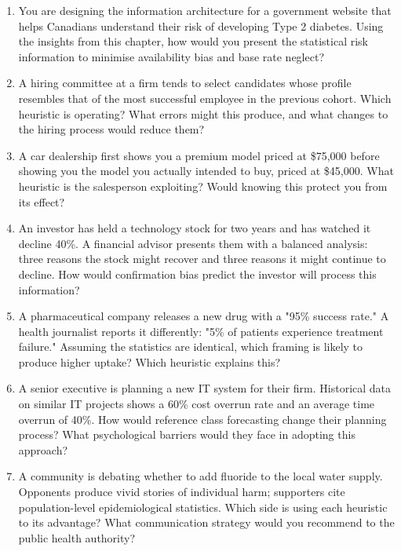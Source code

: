 \documentclass[12pt, letterpaper]{article}
\begin{document}
\begin{enumerate}
\item You are designing the information architecture for a government website that helps Canadians understand their risk of developing Type 2 diabetes. Using the insights from this chapter, how would you present the statistical risk information to minimise availability bias and base rate neglect?

\item A hiring committee at a firm tends to select candidates whose profile resembles that of the most successful employee in the previous cohort. Which heuristic is operating? What errors might this produce, and what changes to the hiring process would reduce them?

\item A car dealership first shows you a premium model priced at \$75,000 before showing you the model you actually intended to buy, priced at \$45,000. What heuristic is the salesperson exploiting? Would knowing this protect you from its effect?

\item An investor has held a technology stock for two years and has watched it decline 40\%. A financial advisor presents them with a balanced analysis: three reasons the stock might recover and three reasons it might continue to decline. How would confirmation bias predict the investor will process this information?

\item A pharmaceutical company releases a new drug with a "95\% success rate." A health journalist reports it differently: "5\% of patients experience treatment failure." Assuming the statistics are identical, which framing is likely to produce higher uptake? Which heuristic explains this?

\item A senior executive is planning a new IT system for their firm. Historical data on similar IT projects shows a 60\% cost overrun rate and an average time overrun of 40\%. How would reference class forecasting change their planning process? What psychological barriers would they face in adopting this approach?

\item A community is debating whether to add fluoride to the local water supply. Opponents produce vivid stories of individual harm; supporters cite population-level epidemiological statistics. Which side is using each heuristic to its advantage? What communication strategy would you recommend to the public health authority?


\end{enumerate}
\end{document}

